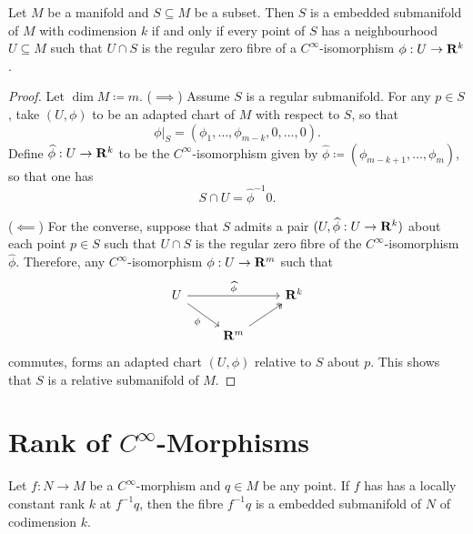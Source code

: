 \begin{lemma}
    \label{lem:embedded-submanifold-iff-regular-fibre}
    Let \(M\) be a manifold and \(S \subseteq M\) be a subset. Then \(S\) is a
    embedded submanifold of \(M\) with codimension \(k\) if and only if every point
    of \(S\) has a neighbourhood \(U \subseteq M\) such that \(U \cap S\) is the
    regular zero fibre of a \(C^{\infty}\)-isomorphism \(\phi: U \to \mathbf{R}^k\).
\end{lemma}

\begin{proof}
    Let \(\dim M \coloneq m\). (\(\implies\)) Assume \(S\) is a regular
    submanifold. For any \(p \in S\), take \((U, \phi)\) to be an adapted chart of
    \(M\) with respect to \(S\), so that
    \[
        \phi|_S = (\phi_1, \dots, \phi_{m-k}, 0, \dots, 0).
    \]
    Define \(\widehat\phi: U \to \mathbf{R}^k\) to be the \(C^{\infty}\)-isomorphism given
    by \(\widehat\phi \coloneq (\phi_{m-k+1}, \dots, \phi_m)\), so that one has
    \[
        S \cap U = \widehat\phi^{-1} 0.
    \]

    (\(\impliedby\)) For the converse, suppose that \(S\) admits a pair
    \((U, \widehat\phi: U \to \mathbf{R}^k)\) about each point \(p \in S\) such that
    \(U \cap S\) is the regular zero fibre of the \(C^{\infty}\)-isomorphism
    \(\widehat\phi\). Therefore, any \(C^{\infty}\)-isomorphism \(\phi: U \to \mathbf{R}^m\)
    such that
    \[
        \begin{tikzcd}
            U \ar[rr, "\widehat\phi"] \ar[rd, "\phi"']& &\R^k \\
            &\R^m \ar[ru, two heads] &
        \end{tikzcd}
    \]
    commutes, forms an adapted chart \((U, \phi)\) relative to \(S\) about
    \(p\). This shows that \(S\) is a relative submanifold of \(M\).
\end{proof}

\section{Rank of \texorpdfstring{\(C^{\infty}\)}{Smooth}-Morphisms}

\begin{theorem}
    \label{thm:constant-rank-fibre-is-embedded-submanifold}
    Let \(f: N \to M\) be a \(C^{\infty}\)-morphism and \(q \in M\) be any point. If
    \(f\) has has a locally constant rank \(k\) at \(f^{-1} q\), then the fibre
    \(f^{-1} q\) is a embedded submanifold of \(N\) of codimension \(k\).
\end{theorem}

